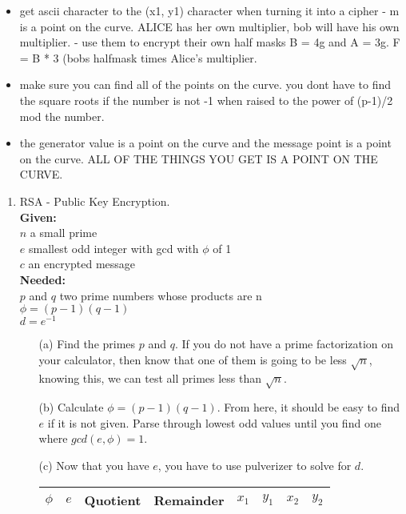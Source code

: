 \documentclass[12pt]{amsart}
\begin{document}
\begin{itemize}
\begin{itemize}
	\item{}get ascii character to the (x1, y1) character when turning it into a cipher - m is a point on the curve.  ALICE has her own multiplier, bob will have his own multiplier. - use them to encrypt their own half masks B = 4g and A = 3g.  F = B * 3 (bobs halfmask times Alice's multiplier.\\
	\item{}make sure you can find all of the points on the curve. you dont have to find the square roots if the number is not -1 when raised to the power of (p-1)/2 mod the number.
	\item{}the generator value is a point on the curve and the message point is a point on the curve.  ALL OF THE THINGS YOU GET IS A POINT ON THE CURVE.
	\end{itemize}
\end{itemize}


\begin{enumerate}
\item RSA - Public Key Encryption. \\
{\bf Given: }\\ $n$ a small prime\\ $e$ smallest odd integer with gcd with $\phi$ of 1\\ $c$ an encrypted message\\
{\bf Needed: }\\ $p$ and $q$ two prime numbers whose products are n\\ $\phi = (p-1)(q-1)$\\
$d = e^{-1}$\\
\begin{itemize}
\item[(a)] Find the primes $p$ and $q$.  If you do not have a prime factorization on your calculator, then know that one of them is going to be less $\sqrt{n}$, knowing this, we can test all primes less than $\sqrt{n}$.\\
\item[(b)] Calculate $\phi = (p-1)(q-1)$.  From here, it should be easy to find $e$ if it is not given.  Parse through lowest odd values until you find one where $gcd(e, \phi) = 1$.\\
\item[(c)] Now that you have $e$, you have to use pulverizer to solve for $d$. 

\begin{center}
\begin{tabular}{ |cccc|cccc| } 
 \hline
 $\phi$ & $e$ & Quotient & Remainder & $x_1$ & $y_1$ & $x_2$ & $y_2$ \\ 
 \hline
\end{tabular}
\end{center}

\end{itemize}

\end{enumerate}
\end{document}
